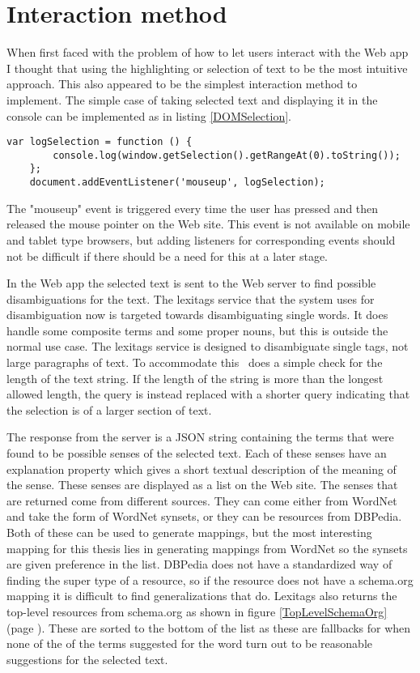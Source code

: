 \section{Interaction method}
\label{Interaction}
When first faced with the problem of how to let users interact with the Web app I thought that using the highlighting or
selection of text to be the most intuitive approach.
This also appeared to be the simplest interaction method to implement.
The simple case of taking selected text and displaying it in the console can be implemented as in listing \ref{DOMSelection}.

\begin{lstlisting}[caption={Logging selected text}, label=DOMSelection]
	var logSelection = function () {
		console.log(window.getSelection().getRangeAt(0).toString());
	};
	document.addEventListener('mouseup', logSelection);
\end{lstlisting}

The "mouseup" event is triggered every time the user has pressed and then released the mouse pointer on the Web site.
This event is not available on mobile and tablet type browsers,
but adding listeners for corresponding events should not be difficult if there should be a need for this at a later stage.

In the Web app the selected text is sent to the Web server to find possible disambiguations for the text.
The lexitags service that the system uses for disambiguation now is targeted towards disambiguating single words.
It does handle some composite terms and some proper nouns, but this is outside the normal use case.
The lexitags service is designed to disambiguate single tags, not large paragraphs of text.
To accommodate this \theartefact\ does a simple check for the length of the text string.
If the length of the string is more than the longest allowed length,
the query is instead replaced with a shorter query indicating that the selection is of a larger section of text.

The response from the server is a JSON string containing the terms that were found to be possible senses of the selected text.
Each of these senses have an explanation property which gives a short textual description of the meaning of the sense.
These senses are displayed as a list on the Web site.
The senses that are returned come from different sources.
They can come either from WordNet and take the form of WordNet synsets, or they can be resources from DBPedia.
Both of these can be used to generate mappings,
but the most interesting mapping for this thesis lies in generating mappings from WordNet so the synsets are given preference in the list.
DBPedia does not have a standardized way of finding the super type of a resource,
so if the resource does not have a schema.org mapping it is difficult to find generalizations that do.
Lexitags also returns the top-level resources from schema.org as shown in figure \ref{TopLevelSchemaOrg} (page \pageref{TopLevelSchemaOrg}).
These are sorted to the bottom of the list as these are fallbacks for when none of the of the terms suggested for
the word turn out to be reasonable suggestions for the selected text.

